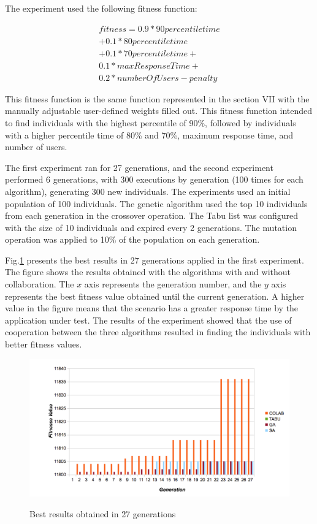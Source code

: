 The experiment used the following fitness function:

\begin{equation}
\begin{aligned}
fitness=0.9* 90percentiletime\\
+0.1*80percentiletime\\+
0.1*70percentiletime+\\
0.1*maxResponseTime+\\
0.2*numberOfUsers-penalty
\end{aligned}
\end{equation}

This fitness function is the same function represented in the section VII with the manually adjustable user-defined weights filled out. This fitness function intended to find individuals with the highest percentile of 90\%, followed by individuals with a higher percentile time of 80\% and 70\%, maximum response time, and number of users.

The first experiment ran for 27 generations, and the second experiment  performed 6 generations, with 300 executions by generation (100 times for each algorithm),  generating 300 new individuals. The experiments used an initial population of 100 individuals. The genetic algorithm used the top 10 individuals from each generation in the crossover operation. The Tabu list was configured with the size of 10 individuals and expired every 2 generations.  The mutation operation was applied to 10\% of the population on each generation. 

Fig.\ref{fig:exp1bestresults} presents the best results in 27 generations applied in the first experiment. The figure shows the results obtained with the algorithms with and without collaboration. The $x$ axis  represents the generation number, and the $y$ axis represents the best fitness value obtained until the current generation.
A higher value in the figure means that the scenario has a greater response time by the application under test. The results of the experiment showed that the use of cooperation between the three algorithms resulted in finding the individuals with better fitness values.

\begin{figure}[h]
\centering
\caption{Best results obtained in 27 generations}
\includegraphics[width=1\textwidth]{./images/generationcomparative.png}
\label{fig:exp1bestresults}
\end{figure}

